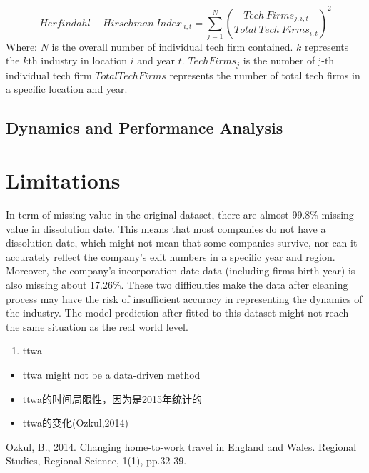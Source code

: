 \documentclass[
  12pt,
  oneside]{book}
\providecommand{\tightlist}{%
  \setlength{\itemsep}{0pt}\setlength{\parskip}{0pt}}
\begin{document}
\[ Herfindahl-Hirschman \ Index_{\ i,t} = \sum_{j=1}^N (\frac{Tech\ Firms_{j,i,t}}{Total\ Tech\ Firms_{i,t}})^2 \]
Where:
\(N\) is the overall number of individual tech firm contained.
\(k\) represents the \(k\)th industry in location \(i\) and year \(t\).
\(Tech Firms_j\) is the number of j-th individual tech firm
\(Total Tech Firms\) represents the number of total tech firms in a specific location and year.

\hypertarget{dynamics-and-performance-analysis}{%
\subsection{Dynamics and Performance Analysis}\label{dynamics-and-performance-analysis}}

\hypertarget{limitations}{%
\section{Limitations}\label{limitations}}

In term of missing value in the original dataset, there are almost 99.8\% missing value in dissolution date. This means that most companies do not have a dissolution date, which might not mean that some companies survive, nor can it accurately reflect the company's exit numbers in a specific year and region. Moreover, the company's incorporation date data (including firms birth year) is also missing about 17.26\%. These two difficulties make the data after cleaning process may have the risk of insufficient accuracy in representing the dynamics of the industry. The model prediction after fitted to this dataset might not reach the same situation as the real world level.

\begin{enumerate}
\def\labelenumi{\arabic{enumi}.}
\tightlist
\item
  ttwa
\end{enumerate}

\begin{itemize}
\tightlist
\item
  ttwa might not be a data-driven method
\item
  ttwa的时间局限性，因为是2015年统计的
\item
  ttwa的变化(Ozkul,2014)
\end{itemize}

Ozkul, B., 2014. Changing home-to-work travel in England and Wales. Regional Studies, Regional Science, 1(1), pp.32-39.
\end{document}

